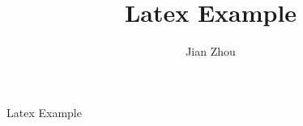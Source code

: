 \documentclass{article}
\title{Latex Example}
\author{Jian Zhou}
\begin{document}


\maketitle

Latex Example~\cite{latex-example}



\end{document}
